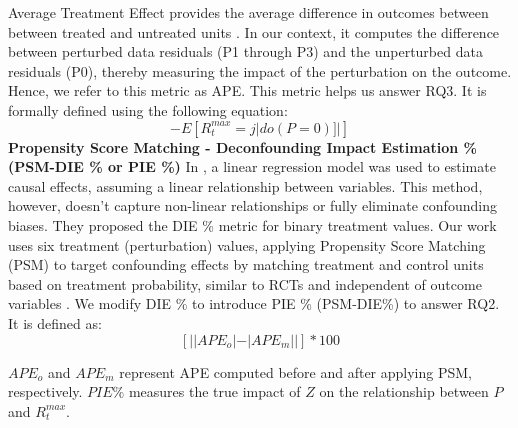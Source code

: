  Average Treatment Effect provides the average difference in outcomes between between treated and untreated units \cite{wang2017g}. In our context, it computes the difference between perturbed data residuals (P1 through P3) and the unperturbed data residuals (P0), thereby measuring the impact of the perturbation on the outcome. Hence, we refer to this metric as APE. This metric helps us answer RQ3. It is formally defined using the following equation: 
\vspace{-0.2em}
{\small
    \begin{equation}
    [|E[R^{max}_{t} = j| do(P = i)] - E[R^{max}_{t} = j| do(P = 0)]| ]
    \label{eq:ape}
    \end{equation}
} 
\noindent \textbf{Propensity Score Matching - Deconfounding Impact Estimation \% (PSM-DIE \% or PIE \%)} In \cite{kausik2024rating}, a linear regression model was used to estimate causal effects, assuming a linear relationship between variables. This method, however, doesn't capture non-linear relationships or fully eliminate confounding biases. They proposed the DIE \% metric for binary treatment values. Our work uses six treatment (perturbation) values, applying Propensity Score Matching (PSM) \cite{rosenbaum1983central} to target confounding effects by matching treatment and control units based on treatment probability, similar to RCTs and independent of outcome variables \cite{baser2007choosing}. We modify DIE \% to introduce PIE \% (PSM-DIE\%) to answer RQ2. It is defined as:
{\small
\begin{equation}
\left[ ||APE_{o}| - |APE_{m}|| \right] * 100
\label{eq:pie}
\end{equation}
}

\noindent $APE_{o}$ and $APE_{m}$ represent APE computed before and after applying PSM, respectively. $PIE \%$ measures the true impact of $Z$ on the relationship between $P$ and $R^{max}_{t}$.



